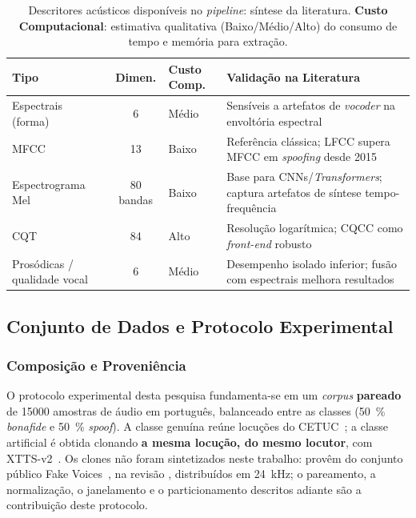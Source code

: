 \documentclass[12pt,a4paper]{article}
\begin{document}
\begin{table}[H]
	\centering
	\caption[Descritores acústicos disponíveis no \textit{pipeline}.]{Descritores acústicos disponíveis no \textit{pipeline}: síntese da
		literatura. \textbf{Custo Computacional}: estimativa qualitativa
		(Baixo/Médio/Alto) do consumo de tempo e memória para extração.}
	\label{tab:ranking_features}
	\small\singlespacing
	\setlength{\tabcolsep}{4pt}
	\begin{tabular}{@{}>{\raggedright\arraybackslash}p{2.8cm}
			c
			>{\raggedright\arraybackslash}p{1.8cm}
			>{\raggedright\arraybackslash}p{4.1cm}@{}}
		\toprule
		\textbf{Tipo} & \textbf{Dimen.} & \textbf{Custo Comp.} &
		\textbf{Validação na Literatura} \\
		\midrule
		Espectrais (forma)
		& 6 & Médio
		& Sensíveis a artefatos de \textit{vocoder} na envoltória
		espectral~\cite{todisco2016new} \\
		\addlinespace
		MFCC
		& 13 & Baixo
		& Referência clássica; LFCC supera MFCC em \textit{spoofing}
		desde 2015~\cite{sahidullah2015comparison, todisco2019asvspoof} \\
		\addlinespace
		Espectrograma Mel
		& 80 bandas & Baixo
		& Base para CNNs/\textit{Transformers}; captura artefatos de
		síntese tempo-frequência~\cite{jung2022aasist, tak2021rawnet2} \\
		\addlinespace
		CQT
		& 84 & Alto
		& Resolução logarítmica; CQCC como \textit{front-end}
		robusto~\cite{todisco2016new} \\
		\addlinespace
		Prosódicas / qualidade vocal
		& 6 & Médio
		& Desempenho isolado inferior; fusão com espectrais melhora
		resultados~\cite{yi2022add} \\
		\bottomrule
	\end{tabular}
\end{table}

\subsection{Conjunto de Dados e Protocolo Experimental}
\label{sec:dataset_protocolo}

\subsubsection{Composição e Proveniência}

O protocolo experimental desta pesquisa fundamenta-se em um \textit{corpus}
\textbf{pareado} de \num{15000} amostras de áudio em português, balanceado
entre as classes (\SI{50}{\percent} \textit{bonafide} e \SI{50}{\percent}
\textit{spoof}). A classe genuína reúne locuções do
CETUC~\cite{alencar2008cetuc}; a classe artificial é obtida clonando
\textbf{a mesma locução, do mesmo locutor}, com XTTS-v2~\cite{casanova2024xtts}.
Os clones não foram sintetizados neste trabalho: provêm do conjunto público
Fake Voices~\cite{fakevoices_card}, na revisão , distribuídos em
\SI{24}{\kilo\hertz}; o pareamento, a normalização, o janelamento e o
particionamento descritos adiante são a contribuição deste protocolo.
\end{document}
